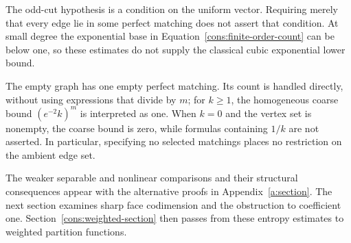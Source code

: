 The odd-cut hypothesis is a condition on the uniform vector. Requiring
merely that every edge lie in some perfect matching does not assert
that condition. At small degree the exponential base in
Equation~\eqref{cons:finite-order-count} can be below one, so these
estimates do not supply the classical cubic exponential lower bound.

The empty graph has one empty perfect matching. Its count is handled
directly, without using expressions that divide by \(m\); for
\(k\ge1\), the homogeneous coarse bound \((e^{-2}k)^m\)
is interpreted as one.
When \(k=0\) and the vertex set is nonempty, the coarse
bound is zero, while formulas containing \(1/k\) are not asserted.
In particular, specifying no selected matchings places no restriction
on the ambient edge set.

The weaker separable and nonlinear comparisons and their structural
consequences appear with the alternative proofs in Appendix~\ref{a:section}.
The next section examines sharp face codimension and the obstruction to
coefficient one. Section~\ref{cons:weighted-section} then passes from
these entropy estimates to weighted partition functions.
